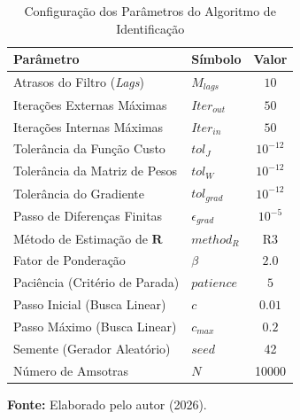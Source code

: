 \documentclass[journal]{IEEEtran}
\begin{document}
\begin{table}[htbp]
    \centering
    \caption{Configuração dos Parâmetros do Algoritmo de Identificação}
    \label{tab:param_algoritmo}
    \begin{tabular}{@{}llc@{}}
        \toprule
        \textbf{Parâmetro} & \textbf{Símbolo} & \textbf{Valor} \\ 
        \midrule
        Atrasos do Filtro (\textit{Lags}) & $M_{lags}$ & $10$ \\
        Iterações Externas Máximas & $Iter_{out}$ & $50$ \\
        Iterações Internas Máximas & $Iter_{in}$ & $50$ \\
        Tolerância da Função Custo & $tol_J$ & $10^{-12}$ \\
        Tolerância da Matriz de Pesos & $tol_W$ & $10^{-12}$ \\
        Tolerância do Gradiente & $tol_{grad}$ & $10^{-12}$ \\
        Passo de Diferenças Finitas & $\epsilon_{grad}$ & $10^{-5}$ \\
        Método de Estimação de $\mathbf{R}$ & $method_R$ & R3 \\
        Fator de Ponderação & $\beta$ & $2.0$ \\
        Paciência (Critério de Parada) & $patience$ & $5$ \\
        Passo Inicial (Busca Linear) & $c$ & $0.01$ \\
        Passo Máximo (Busca Linear) & $c_{max}$ & $0.2$ \\
        Semente (Gerador Aleatório) & $seed$ & 42 \\
        Número de Amsotras & $N$ & 10000 \\
        \bottomrule
    \end{tabular}

\end{table}
\vspace{1pt}
    \centerline{\footnotesize \textbf{Fonte:} Elaborado pelo autor (2026).}
\end{document}
